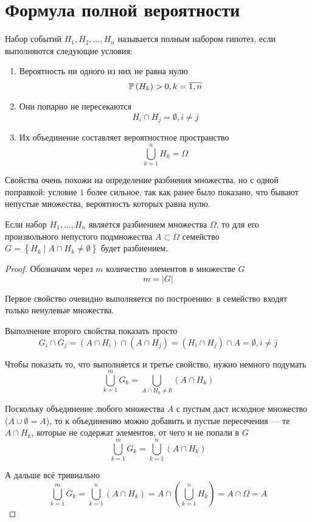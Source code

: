 \section{Формула полной вероятности}
\begin{definition}
    Набор событий $H_1, H_2, \dots, H_n$ называется полным набором гипотез,
    если выполняются следующие условия:
    \begin{enumerate}
        \item Вероятность ни одного из них не равна нулю
            $$\mathbb{P}\left( H_k \right)>0, k=\overline{1,n}$$
        \item Они попарно не пересекаются
            $$H_i\cap H_j=\emptyset, i\neq j$$
        \item Их объединение составляет вероятностное пространство
            $$\bigcup_{k=1}^n H_k=\Omega$$
    \end{enumerate}
    Свойства очень похожи на определение разбиения множества,
    но с одной поправкой: условие $1$ более сильное, так как ранее
    было показано, что бывают непустые множества, вероятность которых
    равна нулю.
\end{definition}
\begin{lemma}
    Если набор $H_1, \dots, H_n$ является разбиением множества $\Omega$,
    то для его произвольного непустого подмножества $A\subset\Omega$
    семейство $G=\left\{H_k\mid A\cap H_k\neq \emptyset\right\}$
    будет разбиением.
\end{lemma}
\begin{proof}
    Обозначим через $m$ количество элементов в множестве $G$
    $$m=\left|G\right|$$

    Первое свойство очевидно выполняется по построению:
    в семейство входят только ненулевые множества.

    Выполнение второго свойства показать просто
    $$G_i\cap G_j = \left(A\cap H_i\right)\cap \left(A\cap H_j\right)
    =\left(H_i\cap H_j\right)\cap A=\emptyset, i\neq j$$

    Чтобы показать то, что выполняется и третье свойство,
    нужно немного подумать
    $$\bigcup_{k=1}^m G_k
    =\bigcup_{A\cap H_k\neq\emptyset} \left(A\cap H_k\right)$$

    Поскольку объединение любого множества $A$ с пустым даст исходное
    множество ($A\cup \emptyset=A$), то к объединению можно добавить
    и пустые пересечения --- те $A\cap H_k$, которые не содержат элементов,
    от чего и не попали в $G$
    $$\bigcup_{k=1}^m G_k=\bigcup_{k=1}^n \left(A\cap H_k\right)$$

    А дальше всё тривиально
    $$\bigcup_{k=1}^m G_k=\bigcup_{k=1}^n \left(A\cap H_k\right)
    =A\cap\left(\bigcup_{k=1}^n H_k\right)=A\cap\Omega=A$$
\end{proof}
